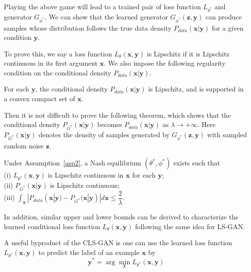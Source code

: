 Playing the above game will lead to a trained pair of loss function $L_{\theta^*}$ and generator $G_{\phi^*}$.
We can show that the learned generator $G_{\phi^*}(\mathbf z, \mathbf y)$ can produce samples whose distribution follows the true data density $P_{data}(\mathbf x|\mathbf y)$ for a given condition $\mathbf y$.

To prove this, we say a loss function $L_\theta(\mathbf x, \mathbf y)$ is Lipschitz if it is Lipschitz continuous in its first argument $\mathbf x$. We also impose the following regularity condition on the conditional density $P_{data}(\mathbf x|\mathbf y)$.
\begin{assumption}\label{asp2}
For each $\mathbf y$, the conditional density $P_{data}(\mathbf x|\mathbf y)$ is Lipschitz, and is supported in a convex compact set of $\mathbf x$.
\end{assumption}

Then it is not difficult to prove the following theorem, which shows that the conditional density $P_{G^*}(\mathbf x|\mathbf y)$ becomes $P_{data}(\mathbf x|\mathbf y)$ as $\lambda\rightarrow +\infty$. Here $P_{G^*}(\mathbf x|\mathbf y)$ denotes the density of samples generated by $G_{\phi^*}(\mathbf z,\mathbf y)$ with sampled random noise $\mathbf z$.

\begin{theorem}\label{thm4}
Under Assumption~\ref{asp2}, a Nash equilibrium $(\theta^*,\phi^*)$ exists such that\\
(i) $L_{\theta^*}(\mathbf x,\mathbf y)$ is Lipschitz continuous in $\mathbf x$ for each $\mathbf y$;\\
(ii) $P_{G^*}(\mathbf x|\mathbf y)$ is Lipschitz continuous;\\
(iii) $\int_{\mathbf x}|P_{data}(\mathbf x|\mathbf y)-P_{G^*}(\mathbf x|\mathbf y)|d\mathbf x \leq \dfrac{2}{\lambda}$.
\end{theorem}

In addition, similar upper and lower bounds can be derived to characterize the learned conditional loss function $L_\theta(\mathbf x, \mathbf y)$ following the same idea for LS-GAN.

A useful byproduct of the CLS-GAN is one can use the learned loss function $L_{\theta^*}(\mathbf x, \mathbf y)$ to predict the label of an example $\mathbf x$ by
\begin{equation}
\mathbf y^* = \arg\min\limits_{\mathbf y} L_{\theta^*}(\mathbf x, \mathbf y)
\end{equation}

